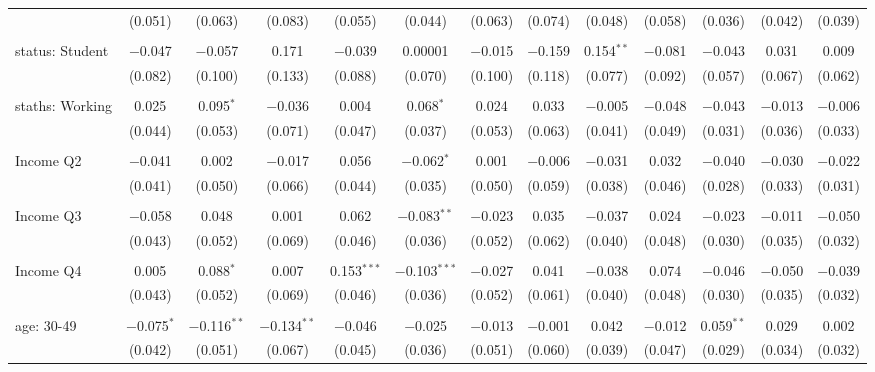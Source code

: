 \begin{tabular}{@{\extracolsep{5pt}}lcccccccccccc}
  & (0.051) & (0.063) & (0.083) & (0.055) & (0.044) & (0.063) & (0.074) & (0.048) & (0.058) & (0.036) & (0.042) & (0.039) \\ 
  & & & & & & & & & & & & \\ 
 status: Student & $-$0.047 & $-$0.057 & 0.171 & $-$0.039 & 0.00001 & $-$0.015 & $-$0.159 & 0.154$^{**}$ & $-$0.081 & $-$0.043 & 0.031 & 0.009 \\ 
  & (0.082) & (0.100) & (0.133) & (0.088) & (0.070) & (0.100) & (0.118) & (0.077) & (0.092) & (0.057) & (0.067) & (0.062) \\ 
  & & & & & & & & & & & & \\ 
 staths: Working & 0.025 & 0.095$^{*}$ & $-$0.036 & 0.004 & 0.068$^{*}$ & 0.024 & 0.033 & $-$0.005 & $-$0.048 & $-$0.043 & $-$0.013 & $-$0.006 \\ 
  & (0.044) & (0.053) & (0.071) & (0.047) & (0.037) & (0.053) & (0.063) & (0.041) & (0.049) & (0.031) & (0.036) & (0.033) \\ 
  & & & & & & & & & & & & \\ 
 Income Q2 & $-$0.041 & 0.002 & $-$0.017 & 0.056 & $-$0.062$^{*}$ & 0.001 & $-$0.006 & $-$0.031 & 0.032 & $-$0.040 & $-$0.030 & $-$0.022 \\ 
  & (0.041) & (0.050) & (0.066) & (0.044) & (0.035) & (0.050) & (0.059) & (0.038) & (0.046) & (0.028) & (0.033) & (0.031) \\ 
  & & & & & & & & & & & & \\ 
 Income Q3 & $-$0.058 & 0.048 & 0.001 & 0.062 & $-$0.083$^{**}$ & $-$0.023 & 0.035 & $-$0.037 & 0.024 & $-$0.023 & $-$0.011 & $-$0.050 \\ 
  & (0.043) & (0.052) & (0.069) & (0.046) & (0.036) & (0.052) & (0.062) & (0.040) & (0.048) & (0.030) & (0.035) & (0.032) \\ 
  & & & & & & & & & & & & \\ 
 Income Q4 & 0.005 & 0.088$^{*}$ & 0.007 & 0.153$^{***}$ & $-$0.103$^{***}$ & $-$0.027 & 0.041 & $-$0.038 & 0.074 & $-$0.046 & $-$0.050 & $-$0.039 \\ 
  & (0.043) & (0.052) & (0.069) & (0.046) & (0.036) & (0.052) & (0.061) & (0.040) & (0.048) & (0.030) & (0.035) & (0.032) \\ 
  & & & & & & & & & & & & \\ 
 age: 30-49 & $-$0.075$^{*}$ & $-$0.116$^{**}$ & $-$0.134$^{**}$ & $-$0.046 & $-$0.025 & $-$0.013 & $-$0.001 & 0.042 & $-$0.012 & 0.059$^{**}$ & 0.029 & 0.002 \\ 
  & (0.042) & (0.051) & (0.067) & (0.045) & (0.036) & (0.051) & (0.060) & (0.039) & (0.047) & (0.029) & (0.034) & (0.032) \\ 

\end{tabular}
